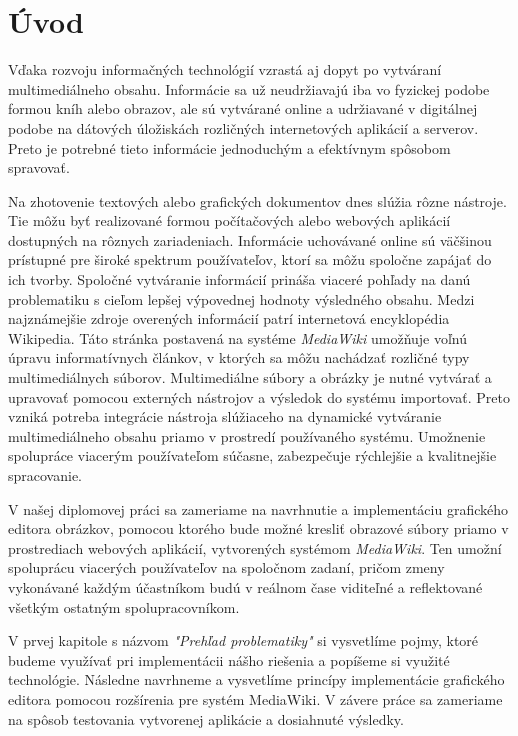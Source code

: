 \chapter*{Úvod}\label{chap:intro}
Vďaka rozvoju informačných technológií vzrastá aj dopyt po vytváraní multimediálneho obsahu. Informácie sa už neudržiavajú iba vo fyzickej podobe formou kníh alebo obrazov, ale sú vytvárané online a udržiavané v digitálnej podobe na dátových úložiskách rozličných internetových aplikácií a serverov. Preto je potrebné tieto informácie jednoduchým a efektívnym spôsobom spravovať. 

Na zhotovenie textových alebo grafických dokumentov dnes slúžia rôzne nástroje. Tie môžu byť realizované formou počítačových alebo webových aplikácií dostupných na rôznych zariadeniach. Informácie uchovávané online sú väčšinou prístupné pre široké spektrum používateľov, ktorí sa môžu spoločne zapájať do ich tvorby. Spoločné vytváranie informácií prináša viaceré pohľady na danú problematiku s cieľom lepšej výpovednej hodnoty výsledného obsahu. Medzi najznámejšie zdroje overených informácií patrí internetová encyklopédia Wikipedia. Táto stránka postavená na systéme \textit{MediaWiki} umožňuje voľnú úpravu informatívnych článkov, v ktorých sa môžu nachádzať rozličné typy multimediálnych súborov. Multimediálne súbory a obrázky je nutné vytvárať a upravovať pomocou externých nástrojov a výsledok do systému importovať. Preto vzniká potreba integrácie nástroja slúžiaceho na dynamické vytváranie multimediálneho obsahu priamo v prostredí používaného systému. Umožnenie spolupráce viacerým používateľom súčasne, zabezpečuje rýchlejšie a kvalitnejšie spracovanie.

V našej diplomovej práci sa zameriame na navrhnutie a implementáciu grafického editora obrázkov, pomocou ktorého bude možné kresliť obrazové súbory priamo v prostrediach webových aplikácií, vytvorených systémom \textit{MediaWiki}. Ten umožní spoluprácu viacerých používateľov na spoločnom zadaní, pričom zmeny vykonávané každým účastníkom budú v reálnom čase viditeľné a reflektované všetkým ostatným spolupracovníkom. 

V prvej kapitole s názvom \textit{"Prehľad problematiky"} si vysvetlíme pojmy, ktoré budeme využívať pri implementácii nášho riešenia a popíšeme si využité technológie. Následne navrhneme a vysvetlíme princípy implementácie grafického editora pomocou rozšírenia pre systém MediaWiki. V závere práce sa zameriame na spôsob testovania vytvorenej aplikácie a dosiahnuté výsledky.
